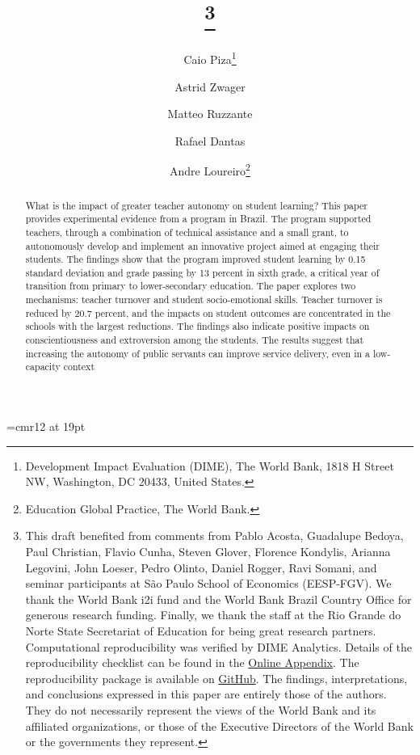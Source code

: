 \documentclass[11pt,a4paper]{article}
\begin{document}

\font\myfont=cmr12 at 19pt
\title{\thanks{This draft benefited from comments from Pablo Acosta, Guadalupe Bedoya, Paul Christian, Flavio Cunha, Steven Glover, Florence Kondylis, Arianna Legovini, John Loeser, Pedro Olinto, Daniel Rogger, Ravi Somani, and seminar participants at São Paulo School of Economics (EESP-FGV). We thank the World Bank i2i fund and the World Bank Brazil Country Office for generous  research  funding. Finally, we thank the staff at the Rio Grande do Norte State Secretariat of Education for being great research partners. Computational reproducibility was verified by DIME Analytics. Details of the reproducibility checklist can be found in the \href{https://github.com/worldbank/brazil-pip-education/blob/master/pip_app.pdf}{Online Appendix}. The reproducibility package is available on \href{https://github.com/worldbank/brazil-pip-education}{GitHub}. The findings, interpretations, and conclusions expressed in this paper are entirely those of the authors. They do not necessarily represent the views of the World Bank and its affiliated organizations, or those of the Executive Directors of the World Bank or the governments they represent.}}

\newcommand*\samethanks[1][\value{footnote}]{\footnotemark[#1]}

\author{%
    Caio Piza\thanks{Development Impact Evaluation (DIME), The World Bank, 1818 H Street NW, Washington, DC 20433, United States.}%
    \and Astrid Zwager\samethanks[2]%
    \and Matteo Ruzzante\samethanks[2]%
    \and Rafael Dantas\samethanks[2]%
    \and Andre Loureiro\thanks{Education Global Practice, The World Bank.}
}

\date{}

\maketitle

\begin{abstract}
	
    \noindent What is the impact of greater teacher autonomy on student learning? This paper provides experimental evidence from a program in Brazil. The program supported teachers, through a combination of technical assistance and a small grant, to autonomously develop and implement an innovative project aimed at engaging their students. The findings show that the program improved student learning by 0.15 standard deviation and grade passing by 13 percent in sixth grade, a critical year of transition from primary to lower-secondary education. The paper explores two mechanisms: teacher turnover and student socio-emotional skills. Teacher turnover is reduced by 20.7 percent, and the impacts on student outcomes are concentrated in the schools with the largest reductions. The findings also indicate positive impacts on conscientiousness and extroversion among the students. The results suggest that increasing the autonomy of public servants can improve service delivery, even in a low-capacity context
    
\end{abstract}
\end{document}
